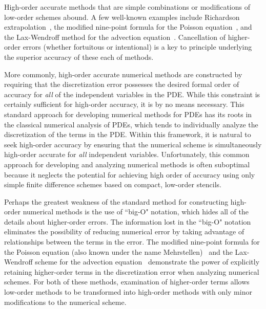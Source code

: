 \documentclass[oneeqnum,onefignum,onetabnum,onethmnum]{siamltex}
\begin{document}
High-order accurate methods that are simple combinations or modifications of 
low-order schemes abound.  A few well-known examples include Richardson 
extrapolation~\cite{richardson_1927,heath_book}, the modified nine-point 
formula for the Poisson equation~\cite{iserles_book}, and the Lax-Wendroff 
method for the advection equation~\cite{leveque_book_1992, leveque_book_2002,
gko_book}.  Cancellation of higher-order errors (whether fortuitous or 
intentional) is a key to principle underlying the superior accuracy of these 
each of methods.

More commonly, high-order accurate numerical methods are constructed by 
requiring that the discretization error possesses the desired formal order of 
accuracy for \emph{all} of the independent variables in the PDE.  While this 
constraint is certainly sufficient for high-order accuracy, it is by no means 
necessary.  This standard approach for developing numerical methods for PDEs 
has its roots in the classical numerical analysis of PDEs, which tends to 
individually analyze the discretization of the terms in the PDE.  Within this 
framework, it is natural to seek high-order accuracy by ensuring that the 
numerical scheme is simultaneously high-order accurate for \emph{all} 
independent variables.  Unfortunately, this common approach for developing 
and analyzing numerical methods is often suboptimal because it neglects the 
potential for achieving high order of accuracy using only simple finite 
difference schemes based on compact, low-order stencils.

Perhaps the greatest weakness of the standard method for constructing 
high-order numerical methods is the use of ``big-O" notation, which hides all 
of the details about higher-order errors.  The information lost in the ``big-O" 
notation eliminates the possibility of reducing numerical error by taking 
advantage of relationships between the terms in the error.  The modified 
nine-point formula for the Poisson equation (also known under the name 
Mehrstellen)~\cite{iserles_book} and the Lax-Wendroff scheme for the 
advection equation~\cite{leveque_book_1992, leveque_book_2002, gko_book} 
demonstrate the power of explicitly retaining higher-order terms in the 
discretization error when analyzing numerical schemes.  For both of these 
methods, examination of higher-order terms allows low-order methods to be 
transformed into high-order methods with only minor modifications to the 
numerical scheme.  
\end{document}
